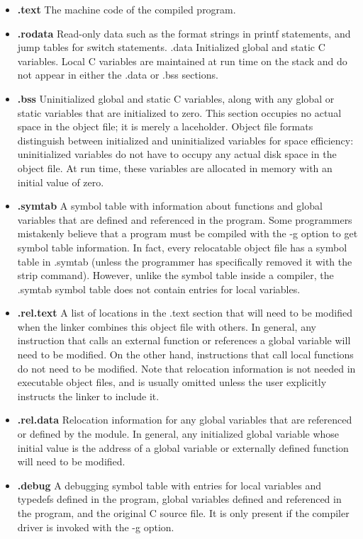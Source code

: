 \begin{itemize}
    \item \textbf{.text} The machine code of the compiled program.
    \item \textbf{.rodata} Read-only data such as the format strings in printf statements, and jump tables for switch statements.
    .data Initialized global and static C variables. Local C variables are maintained at run time on the stack and do not appear in either the .data or .bss sections.
    \item \textbf{.bss} Uninitialized global and static C variables, along with any global or static variables that are initialized to zero. This section occupies no actual space in the object file; it is merely a laceholder. Object file formats distinguish between initialized and uninitialized variables for space efficiency: uninitialized variables do not have to occupy any actual disk space in the object file. At run time, these variables are allocated in memory with an initial value of zero.
    \item \textbf{.symtab} A symbol table with information about functions and global variables
    that are defined and referenced in the program. Some programmers mistakenly believe that a program must be compiled with the -g option to
    get symbol table information. In fact, every relocatable object file has
    a symbol table in .symtab (unless the programmer has specifically removed it with the strip command). However, unlike the symbol table
    inside a compiler, the .symtab symbol table does not contain entries for
    local variables.
    \item \textbf{.rel.text} A list of locations in the .text section that will need to be modified
    when the linker combines this object file with others. In general, any
    instruction that calls an external function or references a global variable will need to be modified. On the other hand, instructions that call local functions do not need to be modified. Note that relocation information is not needed in executable object files, and is usually omitted unless the user explicitly instructs the linker to include it.
    \item \textbf{.rel.data} Relocation information for any global variables that are referenced or defined by the module. In general, any initialized global variable whose initial value is the address of a global variable or externally defined function will need to be modified.
    \item \textbf{.debug} A debugging symbol table with entries for local variables and typedefs defined in the program, global variables defined and referenced in the program, and the original C source file. It is only present if the compiler driver is invoked with the -g option.

\end{itemize}
